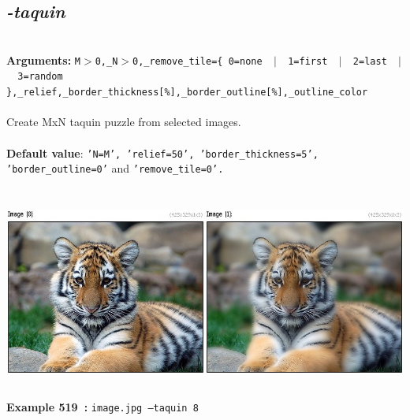 \documentclass[a4paper,11pt,twoside]{book}
\begin{document}
\subsection{\emph{-taquin} }\vspace*{-0.5em}
~\\\textbf{Arguments: } 
{\small \texttt{M$>$0,\_N$>$0,\_remove\_tile=\{ 0=none ~$|$~ 1=first ~$|$~ 2=last ~$|$~ 3=random \},\_relief,\_border\_thickness[\%],\_border\_outline[\%],\_outline\_color}}\\~\\
Create MxN taquin puzzle from selected images.
~\\~\\\textbf{Default value}: {\small \texttt{'N=M', 'relief=50', 'border\_thickness=5', 'border\_outline=0'} and \texttt{'remove\_tile=0'.}}
\begin{center}\includegraphics[keepaspectratio=true,height=7cm,width=\textwidth]{img/gmic_def519.jpg}\\
{\footnotesize \textbf{Example 519~:} \texttt{image.jpg --taquin 8}}
\end{center}
\end{document}
